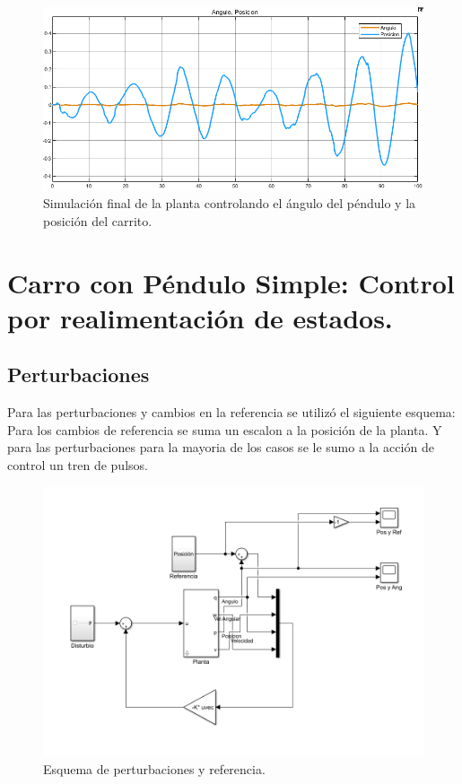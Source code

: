 \begin{figure}[H]
	\centering
	\includegraphics[width=0.8\linewidth]{Imagenes/loopshaping/simulacion_final}
	\caption{Simulación final de la planta controlando el ángulo del péndulo y la posición del carrito.}
	\label{simulacion_solo_angulo}
\end{figure}
\section{Carro con Péndulo Simple: Control por realimentaci\'on de estados.}
\subsection{Perturbaciones}
Para las perturbaciones y cambios en la referencia se utiliz\'o el siguiente esquema:
Para los cambios de referencia se suma un escalon a la posici\'on de la planta. Y para las perturbaciones para la mayoria de los casos se le sumo a la acci\'on de control un tren de pulsos.
\begin{figure}[H]
	\centering
	\includegraphics[width=1\linewidth]{Imagenes/Esquema_general.png}
	\caption{Esquema de perturbaciones y referencia.}
	\label{esq}
\end{figure}

